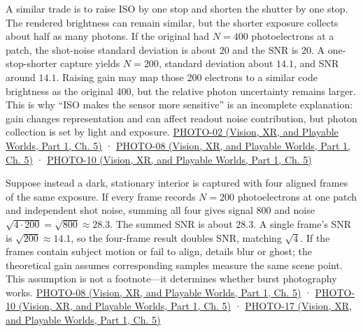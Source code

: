 A similar trade is to raise ISO by one stop and shorten the shutter by one stop. The rendered brightness can remain similar, but the shorter exposure collects about half as many photons. If the original had \(N=400\) photoelectrons at a patch, the shot-noise standard deviation is about \(20\) and the SNR is \(20\). A one-stop-shorter capture yields \(N=200\), standard deviation about \(14.1\), and SNR around \(14.1\). Raising gain may map those 200 electrons to a similar code brightness as the original 400, but the relative photon uncertainty remains larger. This is why ``ISO makes the sensor more sensitive'' is an incomplete explanation: gain changes representation and can affect readout noise contribution, but photon collection is set by light and exposure. \href{../07-Vision-XR-and-Playable-Worlds-P01/main.pdf\#nameddest=04-visual-computing-ii-ch036-photo-02---photography-session-02}{PHOTO-02 (Vision, XR, and Playable Worlds, Part 1, Ch. 5)} · \href{../07-Vision-XR-and-Playable-Worlds-P01/main.pdf\#nameddest=04-visual-computing-ii-ch036-photo-08---photography-session-08}{PHOTO-08 (Vision, XR, and Playable Worlds, Part 1, Ch. 5)} · \href{../07-Vision-XR-and-Playable-Worlds-P01/main.pdf\#nameddest=04-visual-computing-ii-ch036-photo-10---photography-session-10}{PHOTO-10 (Vision, XR, and Playable Worlds, Part 1, Ch. 5)}

Suppose instead a dark, stationary interior is captured with four aligned frames of the same exposure. If every frame records \(N=200\) photoelectrons at one patch and independent shot noise, summing all four gives signal \(800\) and noise \(\sqrt{4\cdot200}=\sqrt{800}\approx28.3\). The summed SNR is about \(28.3\). A single frame's SNR is \(\sqrt{200}\approx14.1\), so the four-frame result doubles SNR, matching \(\sqrt4\). If the frames contain subject motion or fail to align, details blur or ghost; the theoretical gain assumes corresponding samples measure the same scene point. This assumption is not a footnote---it determines whether burst photography works. \href{../07-Vision-XR-and-Playable-Worlds-P01/main.pdf\#nameddest=04-visual-computing-ii-ch036-photo-08---photography-session-08}{PHOTO-08 (Vision, XR, and Playable Worlds, Part 1, Ch. 5)} · \href{../07-Vision-XR-and-Playable-Worlds-P01/main.pdf\#nameddest=04-visual-computing-ii-ch036-photo-10---photography-session-10}{PHOTO-10 (Vision, XR, and Playable Worlds, Part 1, Ch. 5)} · \href{../07-Vision-XR-and-Playable-Worlds-P01/main.pdf\#nameddest=04-visual-computing-ii-ch036-photo-17---photography-session-17}{PHOTO-17 (Vision, XR, and Playable Worlds, Part 1, Ch. 5)}

